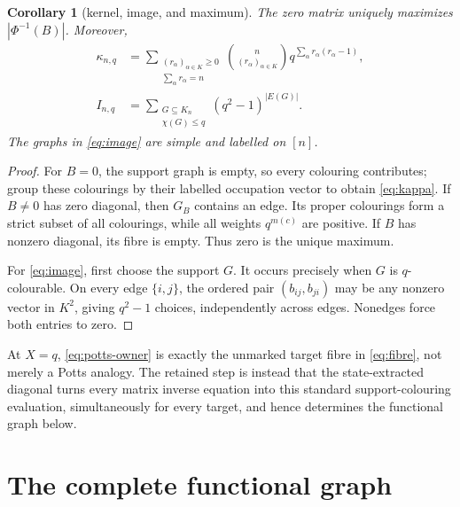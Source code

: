 \documentclass[a4paper,10pt]{amsart}
\newtheorem{corollary}[theorem]{Corollary}
\theoremstyle{remark}
\begin{document}
\begin{corollary}[kernel, image, and maximum]\label{cor:counts}
The zero matrix uniquely maximizes $|\Phi^{-1}(B)|$.  Moreover,
\begin{align}
 \kappa_{n,q}
 &=\sum_{\substack{(r_\alpha)_{\alpha\in K}\ge0\\
                    \sum_\alpha r_\alpha=n}}
   \binom{n}{(r_\alpha)_{\alpha\in K}}
   q^{\sum_\alpha r_\alpha(r_\alpha-1)},
   \label{eq:kappa}\\
 I_{n,q}
 &=\sum_{\substack{G\subseteq K_n\\\chi(G)\le q}}
   (q^2-1)^{|E(G)|}.
   \label{eq:image}
\end{align}
The graphs in \eqref{eq:image} are simple and labelled on $[n]$.
\end{corollary}

\begin{proof}
For $B=0$, the support graph is empty, so every colouring contributes; group
these colourings by their labelled occupation vector to obtain
\eqref{eq:kappa}.  If $B\ne0$ has zero diagonal, then $G_B$ contains an
edge.  Its proper colourings form a strict subset of all colourings, while
all weights $q^{m(c)}$ are positive.  If $B$ has nonzero diagonal, its fibre
is empty.  Thus zero is the unique maximum.

For \eqref{eq:image}, first choose the support $G$.  It occurs precisely when
$G$ is $q$-colourable.  On every edge $\{i,j\}$, the ordered pair
$(b_{ij},b_{ji})$ may be any nonzero vector in $K^2$, giving $q^2-1$
choices, independently across edges.  Nonedges force both entries to zero.
\end{proof}

At $X=q$, \eqref{eq:potts-owner} is exactly the unmarked target fibre in
\eqref{eq:fibre}, not merely a Potts analogy.  The retained step is instead
that the state-extracted diagonal turns every matrix inverse equation into
this standard support-colouring evaluation, simultaneously for every
target, and hence determines the functional graph below.

\section{The complete functional graph}
\end{document}

